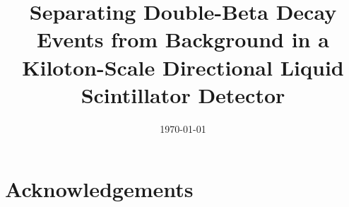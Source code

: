 



\graphicspath{{plots/}}

\linenumbers
{}

\title{Separating Double-Beta Decay Events from Background in a Kiloton-Scale Directional Liquid Scintillator Detector}


\begin{abstract}

\end{abstract}

\date{\today}

\maketitle

\newpage
\tableofcontents
\newpage

\linenumbers\relax %



%
\clearpage %
%
\clearpage %

%
\clearpage %

%
\clearpage %

%
\clearpage %

\section*{Acknowledgements}




%




